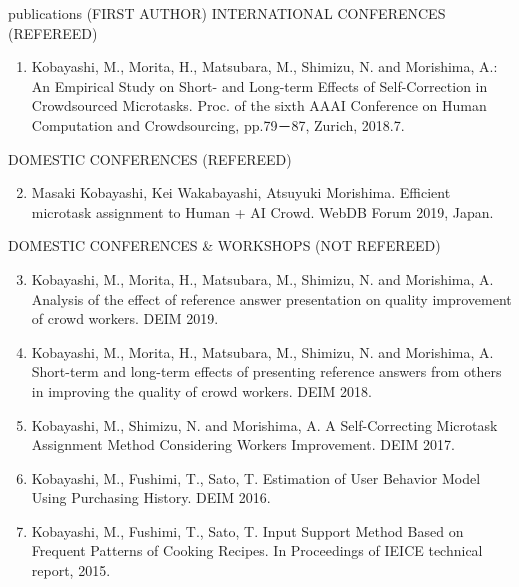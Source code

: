 \documentclass{resume} %
\begin{document}
\begin{rSection}{publications (FIRST AUTHOR)}
INTERNATIONAL CONFERENCES (REFEREED)
\begin{enumerate}
  \setcounter{enumi}{0}
  \item Kobayashi, M., Morita, H., Matsubara, M., Shimizu, N. and Morishima, A.: An Empirical Study on Short- and Long-term Effects of Self-Correction in Crowdsourced Microtasks. Proc. of the sixth AAAI Conference on Human Computation and Crowdsourcing, pp.79－87, Zurich, 2018.7.
\end{enumerate}

DOMESTIC CONFERENCES (REFEREED)
\begin{enumerate}
  \setcounter{enumi}{1}
  \item Masaki Kobayashi, Kei Wakabayashi, Atsuyuki Morishima. Efficient microtask assignment to Human + AI Crowd. WebDB Forum 2019, Japan.
\end{enumerate}

DOMESTIC CONFERENCES \& WORKSHOPS (NOT REFEREED)
\begin{enumerate}
  \setcounter{enumi}{2}
  \item Kobayashi, M., Morita, H., Matsubara, M., Shimizu, N. and Morishima, A. Analysis of the effect of reference answer presentation on quality improvement of crowd workers. DEIM 2019.
  \item Kobayashi, M., Morita, H., Matsubara, M., Shimizu, N. and Morishima, A. Short-term and long-term effects of presenting reference answers from others in improving the quality of crowd workers. DEIM 2018.
  \item Kobayashi, M., Shimizu, N. and Morishima, A. A Self-Correcting Microtask Assignment Method Considering Workers Improvement. DEIM 2017.
  \item Kobayashi, M., Fushimi, T., Sato, T. Estimation of User Behavior Model Using Purchasing History. DEIM 2016.
  \item Kobayashi, M., Fushimi, T., Sato, T. Input Support Method Based on Frequent Patterns of Cooking Recipes. In Proceedings of IEICE technical report, 2015.
\end{enumerate}
\end{rSection}
\end{document}
